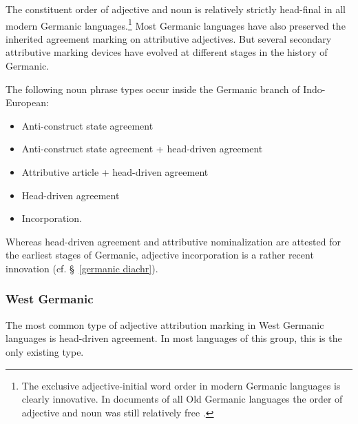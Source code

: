 The constituent order of adjective and noun is relatively strictly head-final in all modern Germanic languages.\footnote{The exclusive adjective-initial word order in modern Germanic languages is clearly innovative. In documents of all Old Germanic languages the order of adjective and noun was still relatively free \citep[cf.][]{heinrichs1954}.} Most Germanic languages have also preserved the inherited agreement marking on attributive adjectives. But several secondary attributive marking devices have evolved at different stages in the history of Germanic.

The following noun phrase types occur inside the Germanic branch of Indo-European:
\begin{itemize}
\item{Anti-construct state agreement}
\item{Anti-construct state agreement + head-driven agreement}
\item{Attributive article + head-driven agreement}
\item{Head-driven agreement}
\item{Incorporation.}
\end{itemize}
Whereas head-driven agreement and attributive nominalization are attested for the earliest stages of Germanic, adjective incorporation is a rather recent innovation (cf. \S~\ref{germanic diachr}).

\subsubsection{West Germanic}\label{w-germanic synchr}
The most common type of adjective attribution marking in West Germanic languages is head-driven agreement. In most languages of this group, this is the only existing type.

